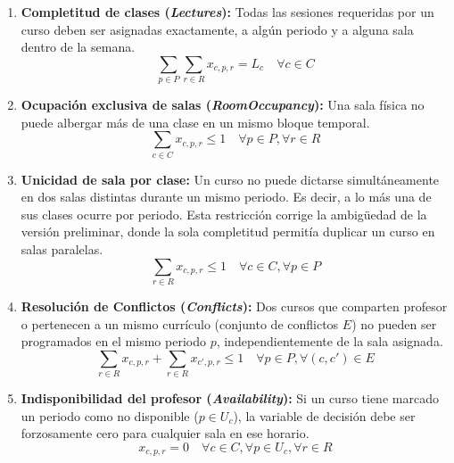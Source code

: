 \documentclass[letter, 10pt]{article}
\begin{document}
\begin{enumerate}
    \item \textbf{Completitud de clases (\textit{Lectures}):} Todas las sesiones requeridas por un curso deben ser asignadas exactamente, a algún periodo y a alguna sala dentro de la semana.
    \begin{equation}
    \sum_{p \in P} \sum_{r \in R} x_{c,p,r} = L_c \quad \forall c \in C
    \end{equation}

    \item \textbf{Ocupación exclusiva de salas (\textit{RoomOccupancy}):} Una sala física no puede albergar más de una clase en un mismo bloque temporal.
    \begin{equation}
    \sum_{c \in C} x_{c,p,r} \leq 1 \quad \forall p \in P, \forall r \in R
    \end{equation}

    \item \textbf{Unicidad de sala por clase:} Un curso no puede dictarse simultáneamente en dos salas distintas durante un mismo periodo. Es decir, a lo más una de sus clases ocurre por periodo. Esta restricción corrige la ambigüedad de la versión preliminar, donde la sola completitud permitía duplicar un curso en salas paralelas.
    \begin{equation}
    \sum_{r \in R} x_{c,p,r} \leq 1 \quad \forall c \in C, \forall p \in P
    \end{equation}

    \item \textbf{Resolución de Conflictos (\textit{Conflicts}):} Dos cursos que comparten profesor o pertenecen a un mismo currículo (conjunto de conflictos $E$) no pueden ser programados en el mismo periodo $p$, independientemente de la sala asignada.
    \begin{equation}
    \sum_{r \in R} x_{c,p,r} + \sum_{r \in R} x_{c',p,r} \leq 1 \quad \forall p \in P, \forall (c, c') \in E
    \end{equation}

    \item \textbf{Indisponibilidad del profesor (\textit{Availability}):} Si un curso tiene marcado un periodo como no disponible ($p \in U_c$), la variable de decisión debe ser forzosamente cero para cualquier sala en ese horario.
    \begin{equation}
    x_{c,p,r} = 0 \quad \forall c \in C, \forall p \in U_c, \forall r \in R
    \end{equation}
\end{enumerate}
\end{document}
